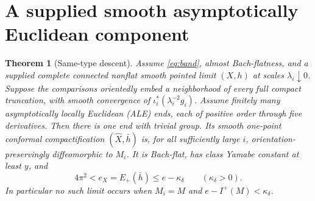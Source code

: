 \documentclass[11pt]{article}
\numberwithin{equation}{section}
\newtheorem{theorem}{Theorem}[section]
\theoremstyle{definition}
\theoremstyle{remark}
\begin{document}
\section{A supplied smooth asymptotically Euclidean component}

\begin{theorem}[Same-type descent]\label{thm:ale-descent}
Assume \eqref{eq:band}, almost Bach-flatness, and a supplied
complete connected nonflat smooth pointed limit \((X,h)\)
at scales \(\lambda_i\downarrow0\). Suppose the comparisons
orientedly embed a neighborhood of every full compact
truncation, with smooth convergence of
\(\iota_i^*(\lambda_i^{-2}g_i)\). Assume finitely many
asymptotically locally Euclidean (ALE) ends, each of positive
order through five derivatives. Then there is one end with
trivial group. Its smooth one-point conformal compactification
\((\widehat X,\bar h)\) is, for all sufficiently large \(i\),
orientation-preservingly diffeomorphic to \(M_i\).
It is Bach-flat, has class Yamabe constant at least \(y\), and
\begin{equation}\label{eq:strictdrop}
 4\pi^2< e_X=E_+(\bar h)\le e-\kappa_\delta
 \qquad(\kappa_\delta>0).
\end{equation}
In particular no such limit occurs when \(M_i=M\) and
\(e-I^+(M)<\kappa_\delta\).
\end{theorem}
\end{document}
